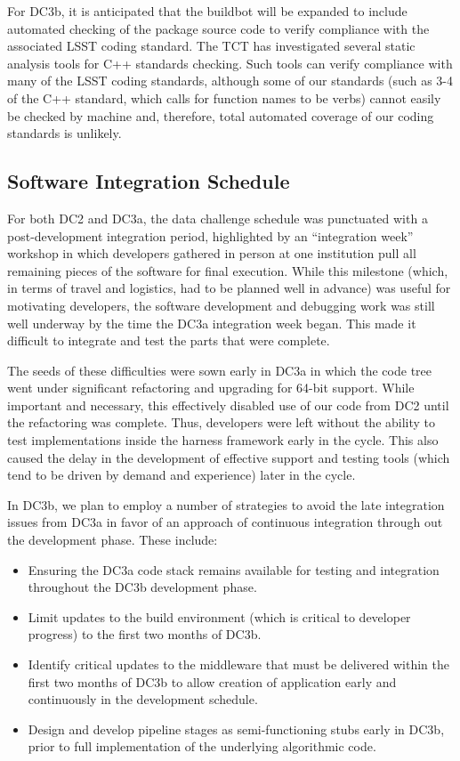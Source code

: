For DC3b, it is anticipated that the buildbot will be expanded to include
automated checking of the package source code to verify compliance with
the associated LSST coding standard. The TCT has investigated several
static analysis tools for C++ standards checking. Such tools can verify
compliance with many of the LSST coding standards, although some of
our standards (such as 3-4 of the C++ standard, which calls for function
names to be verbs) cannot easily be checked by machine and, therefore,
total automated coverage of our coding standards is unlikely.

\subsection{Software Integration Schedule}

For both DC2 and DC3a, the data challenge schedule was punctuated with
a post-development integration period, highlighted by an
``integration week'' workshop in which developers gathered in person
at one institution pull all remaining pieces of the software for
final execution.  While this milestone (which, in terms of travel and
logistics, had to be planned well in advance) was useful for
motivating developers, the software development and debugging work was
still well underway by the time the DC3a integration week began.  This
made it difficult to integrate and test the parts that were complete.  

The seeds of these difficulties were sown early in DC3a in which the
code tree went under significant refactoring and upgrading for 64-bit
support.  While important and necessary, this effectively disabled use
of our code from DC2 until the refactoring was complete.  Thus,
developers were left without the ability to test implementations
inside the harness framework early in the cycle.  This also caused the
delay in the development of effective support and testing tools (which
tend to be driven by demand and experience) later in the cycle.

In DC3b, we plan to employ a number of strategies to avoid the late
integration issues from DC3a in favor of an approach of continuous
integration through out the development phase.  These include:

\begin{itemize}
\item Ensuring the DC3a code stack remains available for testing and
  integration throughout the DC3b development phase.
\item Limit updates to the build environment (which is critical to
  developer progress) to the first two months of DC3b.
\item Identify critical updates to the middleware that must be
  delivered within the first two months of DC3b to allow 
  creation of application early and continuously in the development
  schedule. 
\item Design and develop pipeline stages as semi-functioning stubs
  early in DC3b, prior to full implementation of the underlying
  algorithmic code.  
\end{itemize}

